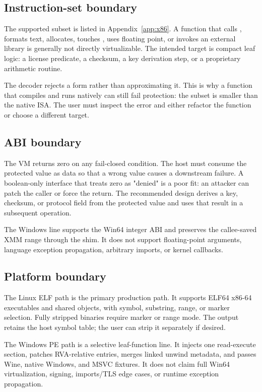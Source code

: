 \subsection{Instruction-set boundary}

The supported subset is listed in Appendix~\ref{app:x86}. A function that calls
, formats text, allocates, touches , uses floating point,
or invokes an external library is generally not directly virtualizable. The
intended target is compact leaf logic: a license predicate, a checksum, a key
derivation step, or a proprietary arithmetic routine.

The decoder rejects a form rather than approximating it. This is why a function
that compiles and runs natively can still fail protection: the subset is smaller
than the native ISA. The user must inspect the error and either refactor the
function or choose a different target.

\subsection{ABI boundary}

The VM returns zero on any fail-closed condition. The host must consume the
protected value as data so that a wrong value causes a downstream failure. A
boolean-only interface that treats zero as "denied" is a poor fit: an attacker
can patch the caller or force the return. The recommended design derives a key,
checksum, or protocol field from the protected value and uses that result in a
subsequent operation.

The Windows line supports the Win64 integer ABI and preserves the callee-saved
XMM range through the shim. It does not support floating-point arguments,
language exception propagation, arbitrary imports, or kernel callbacks.

\subsection{Platform boundary}

The Linux ELF path is the primary production path. It supports ELF64 x86-64
executables and shared objects, with symbol, substring, range, or marker
selection. Fully stripped binaries require marker or range mode. The output
retains the host symbol table; the user can strip it separately if desired.

The Windows PE path is a selective leaf-function line. It injects one
read-execute section, patches RVA-relative entries, merges linked unwind
metadata, and passes Wine, native Windows, and MSVC  fixtures.
It does not claim full Win64 virtualization, signing, imports/TLS edge cases, or
runtime exception propagation.


